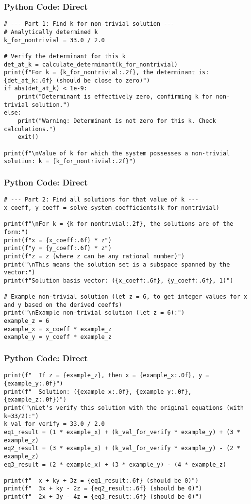 \documentclass{beamer}
\begin{document}
\begin{frame}[fragile]
\frametitle{Python Code: Direct}
\begin{lstlisting}
# --- Part 1: Find k for non-trivial solution ---
# Analytically determined k
k_for_nontrivial = 33.0 / 2.0

# Verify the determinant for this k
det_at_k = calculate_determinant(k_for_nontrivial)
print(f"For k = {k_for_nontrivial:.2f}, the determinant is: {det_at_k:.6f} (should be close to zero)")
if abs(det_at_k) < 1e-9:
    print("Determinant is effectively zero, confirming k for non-trivial solution.")
else:
    print("Warning: Determinant is not zero for this k. Check calculations.")
    exit()

print(f"\nValue of k for which the system possesses a non-trivial solution: k = {k_for_nontrivial:.2f}")
\end{lstlisting}
 \end{frame}

\begin{frame}[fragile]
\frametitle{Python Code: Direct}
\begin{lstlisting}
# --- Part 2: Find all solutions for that value of k ---
x_coeff, y_coeff = solve_system_coefficients(k_for_nontrivial)

print(f"\nFor k = {k_for_nontrivial:.2f}, the solutions are of the form:")
print(f"x = {x_coeff:.6f} * z")
print(f"y = {y_coeff:.6f} * z")
print(f"z = z (where z can be any rational number)")
print("\nThis means the solution set is a subspace spanned by the vector:")
print(f"Solution basis vector: ({x_coeff:.6f}, {y_coeff:.6f}, 1)")

# Example non-trivial solution (let z = 6, to get integer values for x and y based on the derived coeffs)
print("\nExample non-trivial solution (let z = 6):")
example_z = 6
example_x = x_coeff * example_z
example_y = y_coeff * example_z
\end{lstlisting}
 \end{frame}

\begin{frame}[fragile]
\frametitle{Python Code: Direct}
\begin{lstlisting}
print(f"  If z = {example_z}, then x = {example_x:.0f}, y = {example_y:.0f}")
print(f"  Solution: ({example_x:.0f}, {example_y:.0f}, {example_z:.0f})")
print("\nLet's verify this solution with the original equations (with k=33/2):")
k_val_for_verify = 33.0 / 2.0
eq1_result = (1 * example_x) + (k_val_for_verify * example_y) + (3 * example_z)
eq2_result = (3 * example_x) + (k_val_for_verify * example_y) - (2 * example_z)
eq3_result = (2 * example_x) + (3 * example_y) - (4 * example_z)

print(f"  x + ky + 3z = {eq1_result:.6f} (should be 0)")
print(f"  3x + ky - 2z = {eq2_result:.6f} (should be 0)")
print(f"  2x + 3y - 4z = {eq3_result:.6f} (should be 0)")
\end{lstlisting}
 \end{frame}
\end{document}
